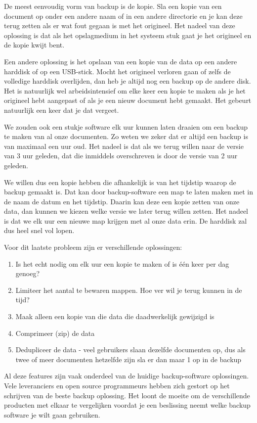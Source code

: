 De meest eenvoudig vorm van backup is de kopie. Sla een kopie van een document op onder een andere naam of in een andere directorie en je kan deze terug zetten als er wat fout gegaan is met het origineel. Het nadeel van deze oplossing is dat als het opslagmedium in het systeem stuk gaat je het origineel en de kopie kwijt bent.

Een andere oplossing is het opslaan van een kopie van de data op een andere harddisk of op een USB-stick. Mocht het origineel verloren gaan of zelfs de volledige harddisk overlijden, dan heb je altijd nog een backup op de andere disk. Het is natuurlijk wel arbeidsintensief om elke keer een kopie te maken als je het origineel hebt aangepast of als je een nieuw document hebt gemaakt. Het gebeurt natuurlijk een keer dat je dat vergeet.

We zouden ook een stukje software elk uur kunnen laten draaien om een backup te maken van al onze documenten. Zo weten we zeker dat er altijd een backup is van maximaal een uur oud. Het nadeel is dat als we terug willen naar de versie van 3 uur geleden, dat die inmiddels overschreven is door de versie van 2 uur geleden.

We willen dus een kopie hebben die afhankelijk is van het tijdstip waarop de backup gemaakt is. Dat kan door backup-software een map te laten maken met in de naam de datum en het tijdstip. Daarin kan deze een kopie zetten van onze data, dan kunnen we kiezen welke versie we later terug willen zetten. Het nadeel is dat we elk uur een nieuwe map krijgen met al onze data erin. De harddisk zal dus heel snel vol lopen.

Voor dit laatste probleem zijn er verschillende oplossingen:
\begin{enumerate}
\item Is het echt nodig om elk uur een kopie te maken of is \'e\'en keer per dag genoeg?
\item Limiteer het aantal te bewaren mappen. Hoe ver wil je terug kunnen in de tijd?
\item Maak alleen een kopie van die data die daadwerkelijk gewijzigd is
\item Comprimeer (zip) de data
\item Dedupliceer de data - veel gebruikers slaan dezelfde documenten op, dus als twee of meer documenten hetzelfde zijn sla er dan maar 1 op in de backup
\end{enumerate}

Al deze features zijn vaak onderdeel van de huidige backup-software oplossingen. Vele leveranciers en open source programmeurs hebben zich gestort op het schrijven van de beste backup oplossing. Het loont de moeite om de verschillende producten met elkaar te vergelijken voordat je een beslissing neemt welke backup software je wilt gaan gebruiken.

